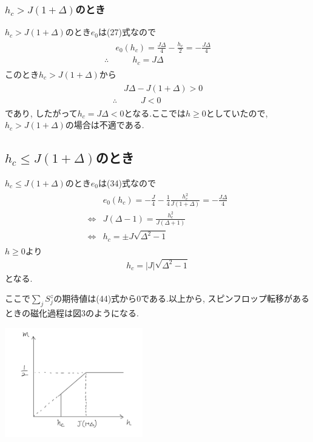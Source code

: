 \documentclass[uplatex,a4j,11pt,dvipdfmx]{jsarticle}
\makeatletter
\def\fgcaption{\def\@captype{figure}\caption}
\def\fgcaption{\def\@captype{figure}\caption}
\makeatother
\begin{document}
\subsubsection*{$h_c>J(1+\Delta)$のとき}
$h_c>J(1+\Delta)$のとき$e_0$は(27)式なので
\begin{align}
  \begin{split}
    &e_0(h_c)=\frac{J\Delta}{4}-\frac{h_c}{2}=-\frac{J\Delta}{4}\\
    \therefore&\qquad h_c=J\Delta
  \end{split}
\end{align}
このとき$h_c>J(1+\Delta)$から
\begin{align}
  \begin{split}
    &J\Delta-J(1+\Delta)>0\\
    \therefore&\qquad J<0
  \end{split}
\end{align}
であり, したがって$h_c=J\Delta<0$となる.ここでは$h\geq0$としていたので,
$h_c>J(1+\Delta)$の場合は不適である.
\subsection*{$h_c\leq J(1+\Delta)$のとき}
$h_c\leq J(1+\Delta)$のとき$e_0$は(34)式なので
\begin{align}
  \begin{array}{cc}
    &e_0(h_c)=-\frac{J}{4}-\frac{1}{4}\frac{h_c^2}{J(1+\Delta)}=-\frac{J\Delta}{4}\\
    \iff&J(\Delta-1)=\frac{h_c^2}{J(\Delta+1)}\\
    \iff&h_c=\pm J\sqrt{\Delta^2-1}
  \end{array}
\end{align}
$h\geq0$より
\begin{align}
  h_c=|J|\sqrt{\Delta^2-1}
\end{align}
となる.

ここで$\sum_jS_j^z$の期待値は(44)式から$0$である.以上から,
スピンフロップ転移があるときの磁化過程は図3のようになる.
\begin{center}
  \includegraphics[width=6cm]{jika_2.png}
  \fgcaption{スピンフロップ転移があるときの磁化過程}
\end{center}
\end{document}
